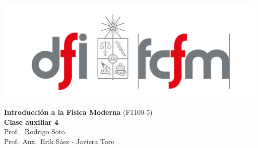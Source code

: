 \documentclass[
  11pt,
  letterpaper,
   addpoints,
  ]{exam}
\begin{document}
\pagestyle{headandfoot}

\noindent
\begin{minipage}{0.47\textwidth}
\includegraphics[width=\textwidth]{../fcfm_die.png}
\end{minipage}
\begin{minipage}{0.53\textwidth}
\begin{center} 
\large\textbf{Introducción a la Física Moderna} (F1100-5) \\
\large\textbf{Clase auxiliar 4} \\
\normalsize Prof.~ Rodrigo Soto.\\
\normalsize Prof.~Aux.~Erik Sáez - Javiera Toro 
\end{center}
\end{minipage}

\vspace{0.5cm}
\noindent
\vspace{.85cm}
\end{document}
